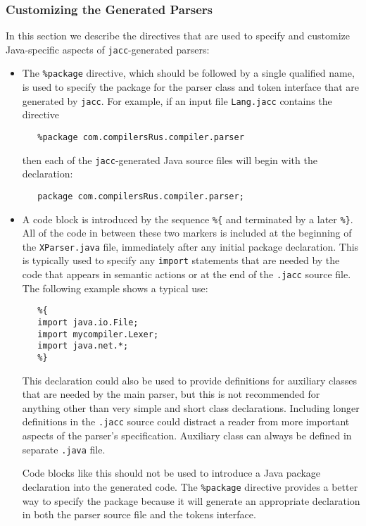 \documentclass[12pt]{article}
\def\jacc{{\tt jacc}}
\begin{document}
\subsubsection{Customizing the Generated Parsers}\label{sec-directives-parser}
In this section we describe the directives that are used to
specify and customize Java-specific aspects of \jacc-generated
parsers:
\begin{itemize}
\item The \verb"%package" directive, which should be followed by
      a single qualified name, is used to specify the package for
      the parser class and token interface that are generated by
      \jacc.  For example, if an input file \verb"Lang.jacc"
      contains the directive
\begin{verbatim}
   %package com.compilersRus.compiler.parser
\end{verbatim}
      then each of the \jacc-generated Java source files will
      begin with the declaration:
\begin{verbatim}
   package com.compilersRus.compiler.parser;
\end{verbatim}

\item A code block is introduced by the sequence \verb"%{" and
      terminated by a later \verb"%}".  All of the code in between
      these two markers is included at the beginning of the
      \verb"XParser.java" file, immediately after any initial
      package declaration.  This is typically used to specify
      any \verb"import" statements that are needed by the
      code that appears in semantic actions or at the end of the
      \verb".jacc" source file.  The following example shows a
      typical use:
\begin{verbatim}
   %{
   import java.io.File;
   import mycompiler.Lexer;
   import java.net.*;
   %}
\end{verbatim}
      This declaration could also be used to provide definitions
      for auxiliary classes that are needed by the main parser,
      but this is not recommended for anything other than very
      simple and short class declarations.  Including longer
      definitions in the \verb".jacc" source could distract a
      reader from more important aspects of the parser's
      specification.  Auxiliary class can always be defined
      in separate \verb".java" file.

      Code blocks like this should not be used to introduce a Java
      package declaration into the generated code.  The \verb"%package"
      directive provides a better way to specify the package because
      it will generate an appropriate declaration in both the parser
      source file and the tokens interface.


\end{itemize}
\end{document}
